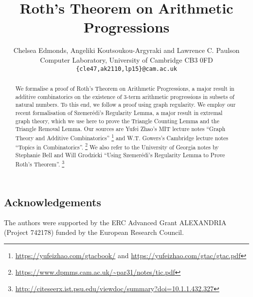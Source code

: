 \documentclass[11pt,a4paper]{article}
\begin{document}
\title{Roth's Theorem on Arithmetic Progressions}
\author{Chelsea Edmonds, Angeliki Koutsoukou-Argyraki and Lawrence C. Paulson\\
Computer Laboratory, University of Cambridge CB3 0FD\\
\texttt{\{cle47,ak2110,lp15\}@cam.ac.uk}}

\maketitle

\begin{abstract}
We formalise a proof of Roth's Theorem on Arithmetic Progressions, a major result in additive 
combinatorics on the existence of 3-term arithmetic progressions in subsets of natural numbers.
To this end, we follow a proof using graph regularity. We employ our recent formalisation of Szemer\'{e}di's 
Regularity Lemma, a major result in extremal graph theory, which we use here to prove
the Triangle Counting Lemma and the Triangle Removal Lemma. 
Our sources are Yufei Zhao's MIT lecture notes ``Graph Theory and Additive Combinatorics''%
\footnote{\url{https://yufeizhao.com/gtacbook/} and \url{https://yufeizhao.com/gtac/gtac.pdf}}
and W.T. Gowers's Cambridge lecture notes ``Topics in Combinatorics''.%
\footnote{\url{https://www.dpmms.cam.ac.uk/~par31/notes/tic.pdf}}
We also refer to the University of Georgia notes by Stephanie Bell and Will Grodzicki
``Using Szemerédi's Regularity Lemma to Prove Roth's Theorem''.%
\footnote{\url{http://citeseerx.ist.psu.edu/viewdoc/summary?doi=10.1.1.432.327}}
\end{abstract}

\tableofcontents

\subsection*{Acknowledgements}
The authors were supported by the ERC Advanced Grant ALEXANDRIA (Project 742178) funded by the European Research Council. 

\newpage


\end{document}
